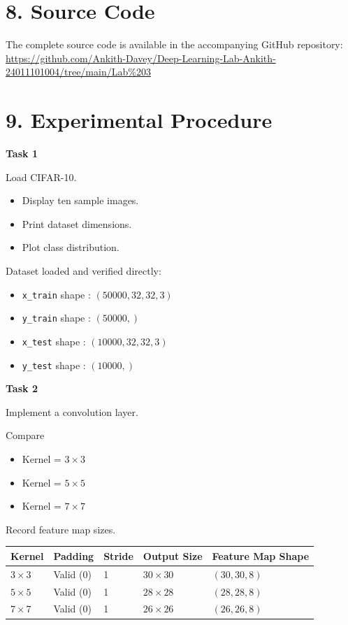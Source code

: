 \documentclass[11pt]{article}
\begin{document}
\section*{8. Source Code}

The complete source code is available in the accompanying GitHub repository: \url{https://github.com/Ankith-Davey/Deep-Learning-Lab-Ankith-24011101004/tree/main/Lab%203}

\section*{9. Experimental Procedure}

\textbf{Task 1}

Load CIFAR-10.

\begin{itemize}
\item Display ten sample images.
\item Print dataset dimensions.
\item Plot class distribution.
\end{itemize}

Dataset loaded and verified directly:

\begin{itemize}
\item \texttt{x\_train} shape : $(50000, 32, 32, 3)$
\item \texttt{y\_train} shape : $(50000,)$
\item \texttt{x\_test} shape : $(10000, 32, 32, 3)$
\item \texttt{y\_test} shape : $(10000,)$
\end{itemize}

\bigskip

\textbf{Task 2}

Implement a convolution layer.

Compare

\begin{itemize}
\item Kernel = $3\times3$
\item Kernel = $5\times5$
\item Kernel = $7\times7$
\end{itemize}

Record feature map sizes.

\begin{center}
\begin{tabular}{|l|l|l|l|l|}
\hline
\textbf{Kernel} & \textbf{Padding} & \textbf{Stride} & \textbf{Output Size} & \textbf{Feature Map Shape}\\
\hline
$3\times3$ & Valid (0) & 1 & $30\times30$ & $(30, 30, 8)$\\
\hline
$5\times5$ & Valid (0) & 1 & $28\times28$ & $(28, 28, 8)$\\
\hline
$7\times7$ & Valid (0) & 1 & $26\times26$ & $(26, 26, 8)$\\
\hline
\end{tabular}
\end{center}
\end{document}
